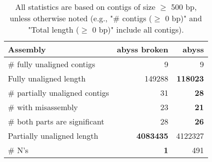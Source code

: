 \documentclass[12pt,a4paper]{article}
\begin{document}
\begin{table}[ht]
\begin{center}
\caption{All statistics are based on contigs of size $\geq$ 500 bp, unless otherwise noted (e.g., "\# contigs ($\geq$ 0 bp)" and "Total length ($\geq$ 0 bp)" include all contigs).}
\begin{tabular}{|l*{2}{|r}|}
\hline
Assembly & abyss broken & abyss \\ \hline
\# fully unaligned contigs & 9 & 9 \\ \hline
Fully unaligned length & 149288 & {\bf 118023} \\ \hline
\# partially unaligned contigs & 31 & {\bf 28} \\ \hline
\hspace{5mm}\# with misassembly & 23 & {\bf 21} \\ \hline
\hspace{5mm}\# both parts are significant & 28 & {\bf 26} \\ \hline
Partially unaligned length & {\bf 4083435} & 4122327 \\ \hline
\# N's & {\bf 1} & 491 \\ \hline
\end{tabular}
\end{center}
\end{table}
\end{document}

